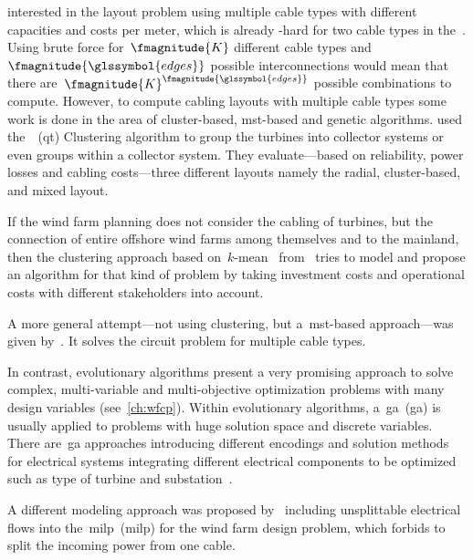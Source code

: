 interested in the layout problem using multiple cable types with different
capacities and costs per meter, which is already \NP-hard for two cable types in
the~. Using brute force for~$\fmagnitude{\cabletypes}$ different
cable types and~$\fmagnitude{\glssymbol{edges}}$ possible interconnections would
mean that there are~$\fmagnitude{\cabletypes}^{\fmagnitude{\glssymbol{edges}} }$
possible combinations to compute. However, to compute cabling layouts with
multiple cable types some work is done in the area of cluster-based,
\gls{mst}-based and genetic algorithms. \textcite{5740480} used
the~~(\gls{qt}) Clustering algorithm to group the turbines into
collector systems or even groups within a collector system. They
evaluate---based on reliability, power losses and cabling costs---three
different layouts namely the radial, cluster-based, and mixed layout.

If the wind farm planning does not consider the cabling of turbines, but the
connection of entire offshore wind farms among themselves and to the mainland,
then the clustering approach based
on~$k$-mean~\parencite{Kanungo:2002:EKC:628329.628801} from~\textcite{Sve13}
tries to model and propose an algorithm for that kind of problem by taking
investment costs and operational costs with different stakeholders into account.

A more general attempt---not using clustering, but a~\gls{mst}-based
approach---was given by~\textcite{berzan}. It solves the circuit problem for
multiple cable types. 

In contrast, evolutionary algorithms present a very promising approach to solve
complex, multi-variable and multi-objective optimization problems with many
design variables (see~\cref{ch:wfcp}). Within evolutionary algorithms,
a~\acrlong{ga}~(\gls{ga}) is usually applied to problems with huge solution
space and discrete variables. There are~\gls{ga} approaches introducing
different encodings and solution methods for electrical systems integrating
different electrical components to be optimized such as type of turbine and
substation~\parencite{citeulike:7362179, 4957255, 5348118, 4152877, 6007042}.

A different modeling approach was proposed
by~\textcite{doi:10.3138/infor.50.2.095} including unsplittable electrical flows
into the~\acrlong{milp}~(\gls{milp}) for the wind farm design problem, which
forbids to split the incoming power from one cable.%

